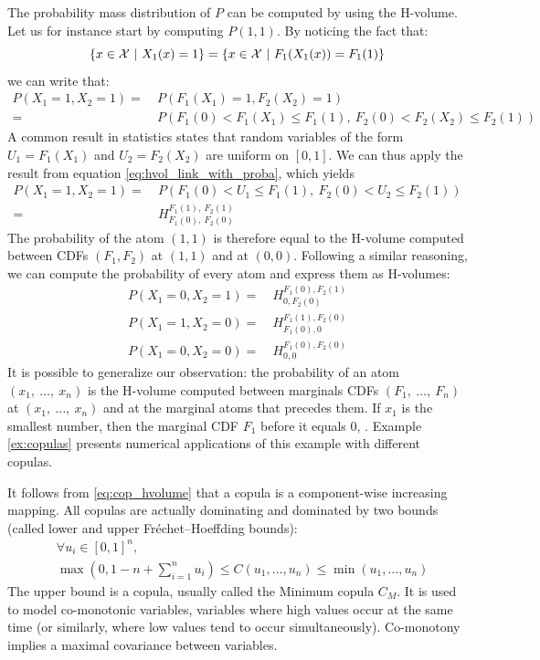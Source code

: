 \begin{example}
    The probability mass distribution of $P$ can be computed by using the H-volume. Let us for instance start by computing $P(1,1)$. By noticing the fact that:
    \begin{equation*}
        \{x\in{\mathcal{X}}~|~X_1(x)=1\}=\{x\in{\mathcal{X}}~|~F_1(X_1(x))=F_1(1)\}
    \end{equation*}
    we can write that:
    \begin{align*}
        P(X_1 = 1, X_2=1) =& ~P(F_1(X_1)= 1, F_2(X_2) = 1)\\
        =& ~P(F_1(0) < F_1(X_1)\leqslant F_1(1), ~F_2(0) < F_2(X_2)\leqslant F_2(1))
    \end{align*}
    A common result in statistics states that random variables of the form $U_1=F_1(X_1)$ and $U_2=F_2(X_2)$ are uniform on $[0,1]$. We can thus apply the result from equation \eqref{eq:hvol_link_with_proba}, which yields
    \begin{align*}
        P(X_1 = 1, X_2=1) =& ~P(F_1(0) < U_1 \leqslant F_1(1), ~F_2(0) < U_2 \leqslant F_2(1))\\
        =& ~H^{F_1(1),~F_2(1)}_{F_1(0),~F_2(0)}
    \end{align*}
    The probability of the atom $(1,1)$ is therefore equal to the H-volume computed between CDFs $(F_1, F_2)$ at $(1, 1)$ and at $(0,0)$. Following a similar reasoning, we can compute the probability of every atom and express them as H-volumes:
    \begin{align*}
        P(X_1=0, X_2=1) =& ~H_{0, F_2(0)}^{F_1(0), F_2(1)}\\
        P(X_1=1, X_2=0) =& ~H_{F_1(0), 0}^{F_1(1), F_2(0)}\\
        P(X_1=0, X_2=0) =& ~H_{0,0}^{F_1(0), F_2(0)}
    \end{align*}
    It is possible to generalize our observation: the probability of an atom $(x_1,~\dots,~x_n)$ is the H-volume computed between marginals CDFs $(F_1,~\dots,~F_n)$ at $(x_1,~\dots,~x_n)$ and at the marginal atoms that precedes them. If $x_1$ is the smallest number, then the marginal CDF $F_1$ before it equals $0$, \etc.
    Example \ref{ex:copulas} presents numerical applications of this example with different copulas.
\end{example}

It follows from \eqref{eq:cop_hvolume} that a copula is a component-wise increasing mapping. All copulas are actually dominating and dominated by two bounds (called lower and upper Fréchet–Hoeffding bounds):
\begin{align}
    &\forall u_i \in [0,1]^n,\nonumber\\
    &\max(0, 1-n+\sum_{i=1}^n u_i) \leqslant C(u_1,\dots,u_n) \leqslant \min(u_1, \dots, u_n)
\end{align}
The upper bound is a copula, usually called the Minimum copula $C_M$. It is used to model co-monotonic variables, \ie variables where high values occur at the same time (or similarly, where low values tend to occur simultaneously). Co-monotony implies a maximal covariance between variables.

